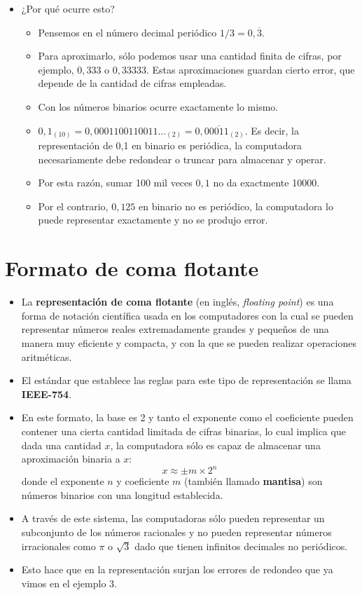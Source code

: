\documentclass[]{book}
\providecommand{\tightlist}{%
  \setlength{\itemsep}{0pt}\setlength{\parskip}{0pt}}
\begin{document}
\begin{itemize}
\item
  ¿Por qué ocurre esto?

  \begin{itemize}
  \tightlist
  \item
    Pensemos en el número decimal periódico \(1/3 = 0,\overline3\).
  \item
    Para aproximarlo, sólo podemos usar una cantidad finita de cifras, por ejemplo, \(0,333\) o \(0,33333\). Estas aproximaciones guardan cierto error, que depende de la cantidad de cifras empleadas.
  \item
    Con los números binarios ocurre exactamente lo mismo.
  \item
    \(0,1_{(10)} = 0,0001100110011..._{(2)} = 0,0\overline{0011}_{(2)}\). Es decir, la representación de 0,1 en binario es periódica, la computadora necesariamente debe redondear o truncar para almacenar y operar.
  \item
    Por esta razón, sumar 100 mil veces \(0,1\) no da exactmente 10000.
  \item
    Por el contrario, \(0,125\) en binario no es periódico, la computadora lo puede representar exactamente y no se produjo error.
  \end{itemize}
\end{itemize}

\hypertarget{formato-de-coma-flotante}{%
\section{Formato de coma flotante}\label{formato-de-coma-flotante}}

\begin{itemize}
\item
  La \textbf{representación de coma flotante} (en inglés, \emph{floating point}) es una forma de notación científica usada en los computadores con la cual se pueden representar números reales extremadamente grandes y pequeños de una manera muy eficiente y compacta, y con la que se pueden realizar operaciones aritméticas.
\item
  El estándar que establece las reglas para este tipo de representación se llama \textbf{IEEE-754}.
\item
  En este formato, la base es 2 y tanto el exponente como el coeficiente pueden contener una cierta cantidad limitada de cifras binarias, lo cual implica que dada una cantidad \(x\), la computadora sólo es capaz de almacenar una aproximación binaria a \(x\):
  \[x \approx \pm m \times 2^n\]
  donde el exponente \(n\) y coeficiente \(m\) (también llamado \textbf{mantisa}) son números binarios con una longitud establecida.
\item
  A través de este sistema, las computadoras sólo pueden representar un subconjunto de los números racionales y no pueden representar números irracionales como \(\pi\) o \(\sqrt3\) dado que tienen infinitos decimales no periódicos.
\item
  Esto hace que en la representación surjan los errores de redondeo que ya vimos en el ejemplo 3.
\end{itemize}
\end{document}

